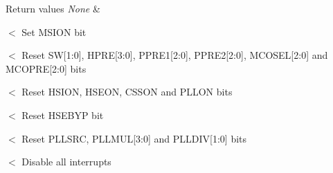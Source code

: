 \begin{DoxyRetVals}{Return values}
{\em None} & \\
\hline
\end{DoxyRetVals}
$<$ Set M\-S\-I\-O\-N bit

$<$ Reset S\-W\mbox{[}1\-:0\mbox{]}, H\-P\-R\-E\mbox{[}3\-:0\mbox{]}, P\-P\-R\-E1\mbox{[}2\-:0\mbox{]}, P\-P\-R\-E2\mbox{[}2\-:0\mbox{]}, M\-C\-O\-S\-E\-L\mbox{[}2\-:0\mbox{]} and M\-C\-O\-P\-R\-E\mbox{[}2\-:0\mbox{]} bits

$<$ Reset H\-S\-I\-O\-N, H\-S\-E\-O\-N, C\-S\-S\-O\-N and P\-L\-L\-O\-N bits

$<$ Reset H\-S\-E\-B\-Y\-P bit

$<$ Reset P\-L\-L\-S\-R\-C, P\-L\-L\-M\-U\-L\mbox{[}3\-:0\mbox{]} and P\-L\-L\-D\-I\-V\mbox{[}1\-:0\mbox{]} bits

$<$ Disable all interrupts 